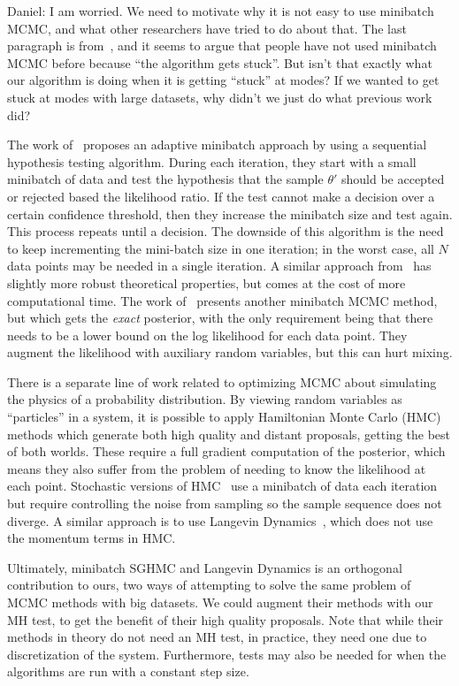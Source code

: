 \documentclass{article}
\begin{document}
{\color{blue}
Daniel: I am worried. We need to motivate why it is not easy to use minibatch MCMC, and what other
researchers have tried to do about that.  The last paragraph is from~\cite{cutting_mh_2014}, and it
seems to argue that people have not used minibatch MCMC before because ``the algorithm gets stuck''.
But isn't that exactly what our algorithm is doing when it is getting ``stuck'' at modes? If we
wanted to get stuck at modes with large datasets, why didn't we just do what previous work did?
}

The work of~\cite{cutting_mh_2014} proposes an adaptive minibatch approach by using a sequential
hypothesis testing algorithm. During each iteration, they start with a small minibatch of data and
test the hypothesis that the sample $\theta'$ should be accepted or rejected based the likelihood
ratio. If the test cannot make a decision over a certain confidence threshold, then they increase
the minibatch size and test again. This process repeats until a decision.  The downside of this
algorithm is the need to keep incrementing the mini-batch size in one iteration; in the worst case,
all $N$ data points may be needed in a single iteration. A similar approach
from~\cite{icml2014c1_bardenet14} has slightly more robust theoretical properties, but comes at the
cost of more computational time. The work of~\cite{conf/uai/MaclaurinA14} presents another minibatch
MCMC method, but which gets the \emph{exact} posterior, with the only requirement being that there
needs to be a lower bound on the log likelihood for each data point. They augment the likelihood
with auxiliary random variables, but this can hurt mixing.

There is a separate line of work related to optimizing MCMC about simulating the physics of a
probability distribution. By viewing random variables as ``particles'' in a system, it is possible
to apply Hamiltonian Monte Carlo (HMC)~\cite{mcmc_hamiltonian_2010} methods which generate both high
quality and distant proposals, getting the best of both worlds. These require a full gradient
computation of the posterior, which means they also suffer from the problem of needing to know the
likelihood at each point. Stochastic versions of HMC~\cite{sghmc_2014,stochastic_thermostats_2014}
use a minibatch of data each iteration but require controlling the noise from sampling so the sample
sequence does not diverge. A similar approach is to use Langevin
Dynamics~\cite{langevin_2011,conf/icml/AhnBW12}, which does not use the momentum terms in HMC.

Ultimately, minibatch SGHMC and Langevin Dynamics is an orthogonal contribution to ours, two ways of
attempting to solve the same problem of MCMC methods with big datasets. We could augment their
methods with our MH test, to get the benefit of their high quality proposals. Note that while their
methods in theory do not need an MH test, in practice, they need one due to discretization of the
system. Furthermore, tests may also be needed for when the algorithms are run with a constant step
size.
\end{document}
